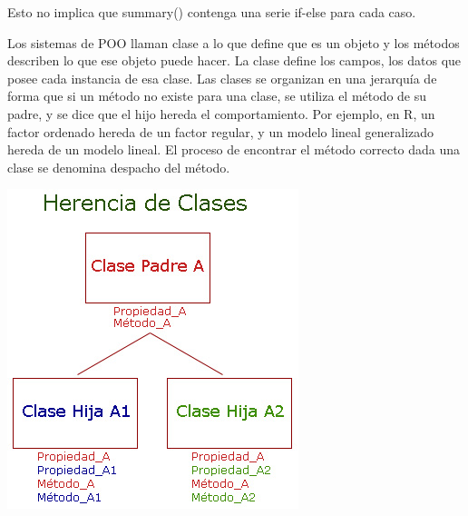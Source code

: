 \documentclass[
]{book}
\newenvironment{Shaded}{\begin{snugshade}}{\end{snugshade}}
\newcommand{\CommentTok}[1]{\textcolor[rgb]{0.56,0.35,0.01}{\textit{#1}}}
\newcommand{\DocumentationTok}[1]{\textcolor[rgb]{0.56,0.35,0.01}{\textbf{\textit{#1}}}}
\newcommand{\FunctionTok}[1]{\textcolor[rgb]{0.13,0.29,0.53}{\textbf{#1}}}
\newcommand{\NormalTok}[1]{#1}
\newcommand{\OtherTok}[1]{\textcolor[rgb]{0.56,0.35,0.01}{#1}}
\newcommand{\SpecialCharTok}[1]{\textcolor[rgb]{0.81,0.36,0.00}{\textbf{#1}}}
\begin{document}
\begin{Shaded}
\end{Shaded}

Esto no implica que summary() contenga una serie if-else para cada caso.

Los sistemas de POO llaman clase a lo que define que es un objeto y los métodos describen lo que ese objeto puede hacer. La clase define los campos, los datos que posee cada instancia de esa clase. Las clases se organizan en una jerarquía de forma que si un método no existe para una clase, se utiliza el método de su padre, y se dice que el hijo hereda el comportamiento. Por ejemplo, en R, un factor ordenado hereda de un factor regular, y un modelo lineal generalizado hereda de un modelo lineal. El proceso de encontrar el método correcto dada una clase se denomina despacho del método.

\includegraphics{graficasR6/clasesherencia.jpg}
\end{document}
